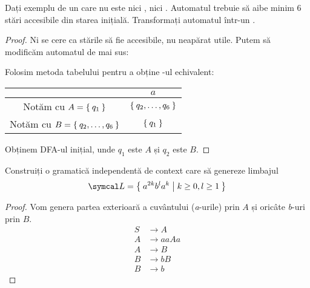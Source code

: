 \begin{exercise}
    Dați exemplu de un \nfa care nu este nici \lnfa, nici \dfa. Automatul trebuie să aibe minim 6 stări accesibile din starea inițială. Transformați automatul într-un \dfa.
\end{exercise}
\begin{proof}
    Ni se cere ca stările să fie accesibile, nu neapărat utile. Putem să modificăm automatul de mai sus:
    \begin{figure}[H]
        \centering
    \end{figure}

    Folosim metoda tabelului pentru a obține \dfa-ul echivalent:
    \begin{center}
        \begin{tabular}{c|c}
                                                   & \(a\)                     \\
            \hline
            Notăm cu \(A = \Set{q_1}\)             & \(\Set{q_2, \dots, q_6}\) \\
            \hline
            Notăm cu \(B = \Set{q_2, \dots, q_6}\) & \(\Set{q_1}\)
        \end{tabular}
    \end{center}
    Obținem DFA-ul inițial, unde \(q_1\) este \(A\) și \(q_2\) este \(B\).
\end{proof}

\begin{exercise}
    Construiți o gramatică independentă de context care să genereze limbajul
    \[\lang = \Set{ a^{2k} b^l a^k | k \geq 0, l \geq 1 }\]
\end{exercise}
\begin{proof}
    Vom genera partea exterioară a cuvântului (\textit{a}-urile) prin \(A\) și oricâte \textit{b}-uri prin \(B\).
    \begin{align*}
        S & \rightarrow A    \\
        A & \rightarrow aaAa \\
        A & \rightarrow B    \\
        B & \rightarrow bB   \\
        B & \rightarrow b
    \end{align*}
\end{proof}

